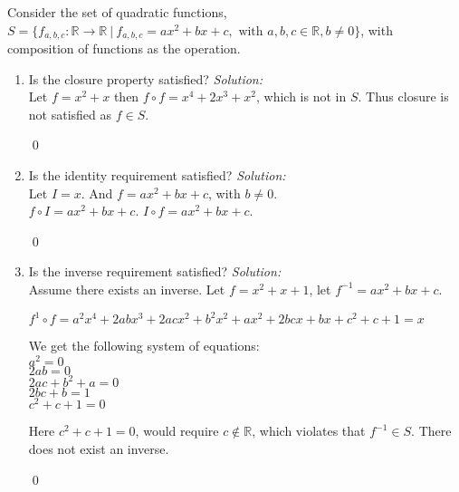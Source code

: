 \documentclass[12 pt]{article}
\newenvironment{problem}[2][Problem]{\begin{trivlist}
\item[\hskip \labelsep {\bfseries #1}\hskip \labelsep {\bfseries #2.}]}{\end{trivlist}}
\newenvironment{sol}
    {\emph{Solution:}
    }
    {
    \qed
    }
\theoremstyle{definition}
\newcommand{\R}{\mathbb{R}} %
\newcommand{\ver}{\ \vert\ }
\begin{document}
\begin{problem}{1}
Consider the set of quadratic functions,\\
$S=\{f_{a,b,c}:\R \rightarrow \R \ver f_{a,b,c}=ax^2+bx+c, \text{ with } a,b,c \in \R, b\neq 0 \}$, with composition of functions as the operation.
\begin{enumerate}[label=\alph*)]
    \item  Is the closure property satisfied? \begin{sol}\\
    Let $f = x^2 + x$ then $f \circ f = x^4 + 2x^3+x^2$, which is not in $S$. Thus closure is not satisfied as $f\in S$.
    \end{sol}
    \item  Is the identity requirement satisfied? \begin{sol}\\
    Let $I = x$. And $f = ax^2+bx+c$, with $b\neq 0$.\\
    $f\circ I = ax^2 + bx + c$. $I\circ f=ax^2+bx+c$.
    \end{sol}
    \item Is the inverse requirement satisfied? \begin{sol}\\
    Assume there exists an inverse. Let $f = x^2 + x + 1$, let $f^{-1} = ax^2 + bx + c$.
    
    
    $f^1\circ f = a^2x^4 + 2abx^3+2acx^2+b^2x^2+ax^2+2bcx+bx+c^2+c+1=x$
    
    We get the following system of equations:\\
    $a^2 = 0$\\
    $2ab = 0$\\
    $2ac + b^2 + a = 0$\\
    $2bc + b= 1$\\
    $c^2+c+1 = 0$
    
    Here $c^2+c+1=0$, would require $c\not\in \R$, which violates that $f^{-1} \in S$. There does not exist an inverse.
    \end{sol}
\end{enumerate}
\end{problem}
\end{document}

